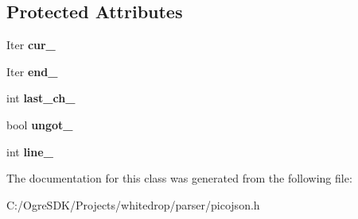 \subsection*{Protected Attributes}
\begin{DoxyCompactItemize}
\item 
\hypertarget{classpicojson_1_1input_afb97b3422a91d0f3388527a5999c8174}{Iter {\bfseries cur\+\_\+}}\label{classpicojson_1_1input_afb97b3422a91d0f3388527a5999c8174}

\item 
\hypertarget{classpicojson_1_1input_acb4fd4c90d1b0db37bc32ccae16361ab}{Iter {\bfseries end\+\_\+}}\label{classpicojson_1_1input_acb4fd4c90d1b0db37bc32ccae16361ab}

\item 
\hypertarget{classpicojson_1_1input_a198f74377fcf1128e496b5dc06a1aad0}{int {\bfseries last\+\_\+ch\+\_\+}}\label{classpicojson_1_1input_a198f74377fcf1128e496b5dc06a1aad0}

\item 
\hypertarget{classpicojson_1_1input_a01956f4acf46afe7f1d84ea493cb41da}{bool {\bfseries ungot\+\_\+}}\label{classpicojson_1_1input_a01956f4acf46afe7f1d84ea493cb41da}

\item 
\hypertarget{classpicojson_1_1input_a7bbb41c7f78ffc19d3219e38c2858b74}{int {\bfseries line\+\_\+}}\label{classpicojson_1_1input_a7bbb41c7f78ffc19d3219e38c2858b74}

\end{DoxyCompactItemize}


The documentation for this class was generated from the following file\+:\begin{DoxyCompactItemize}
\item 
C\+:/\+Ogre\+S\+D\+K/\+Projects/whitedrop/parser/picojson.\+h\end{DoxyCompactItemize}
